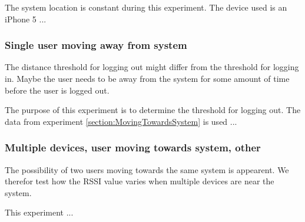 The system location is constant during this experiment. The device used is an iPhone 5 ...

\subsubsection{Single user moving away from system}
The distance threshold for logging out might differ from the threshold for logging in. Maybe the user needs to be away from the system for some amount of time before the user is logged out. 

The purpose of this experiment is to determine the threshold for logging out. The data from experiment \ref{section:MovingTowardsSystem} is used ...


\subsubsection{Multiple devices, user moving towards system, other}
The possibility of two users moving towards the same system is appearent. We therefor test how the RSSI value varies when multiple devices are near the system.

This experiment ...

